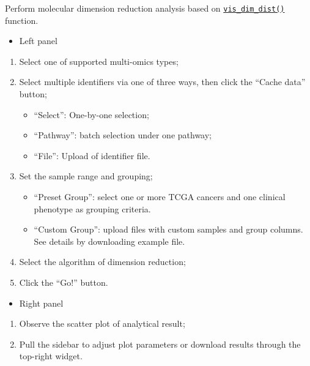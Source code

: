 \documentclass[
]{book}
\providecommand{\tightlist}{%
  \setlength{\itemsep}{0pt}\setlength{\parskip}{0pt}}
\begin{document}
Perform molecular dimension reduction analysis based on \hyperref[vis-dim-dist]{\texttt{vis\_dim\_dist()}} function.

\begin{itemize}
\tightlist
\item
  Left panel
\end{itemize}

\begin{enumerate}
\def\labelenumi{\arabic{enumi}.}
\tightlist
\item
  Select one of supported multi-omics types;
\item
  Select multiple identifiers via one of three ways, then click the ``Cache data'' button;

  \begin{itemize}
  \tightlist
  \item
    ``Select'': One-by-one selection;
  \item
    ``Pathway'': batch selection under one pathway;
  \item
    ``File'': Upload of identifier file.
  \end{itemize}
\item
  Set the sample range and grouping;

  \begin{itemize}
  \tightlist
  \item
    ``Preset Group'': select one or more TCGA cancers and one clinical phenotype as grouping criteria.
  \item
    ``Custom Group'': upload files with custom samples and group columns. See details by downloading example file.
  \end{itemize}
\item
  Select the algorithm of dimension reduction;
\item
  Click the ``Go!'' button.
\end{enumerate}

\begin{itemize}
\tightlist
\item
  Right panel
\end{itemize}

\begin{enumerate}
\def\labelenumi{\arabic{enumi}.}
\tightlist
\item
  Observe the scatter plot of analytical result;
\item
  Pull the sidebar to adjust plot parameters or download results through the top-right widget.
\end{enumerate}
\end{document}
